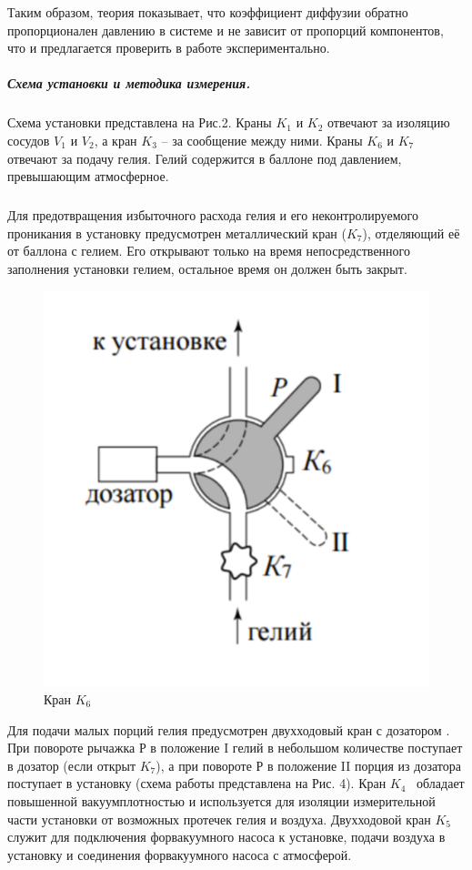 \documentclass[a4paper,12pt]{article}
\begin{document}
 
 Таким образом, теория показывает, что коэффициент диффузии обратно пропорционален давлению в системе и не зависит от пропорций компонентов, что и предлагается проверить в работе экспериментально. 
 

 
 
 \subparagraph*{Схема установки и методика измерения.} 
 
 Схема установки представлена на Рис.2. Краны $K_1$ и $K_2$ отвечают за изоляцию сосудов $V_1$ и $V_2$, а кран $K_3$ -- за сообщение между ними. Краны $K_6$ и  $K_7$ отвечают за подачу гелия. Гелий содержится в баллоне  под давлением, превышающим атмосферное. 

\subparagraph*{}Для предотвращения избыточного расхода гелия и его неконтролируемого проникания в установку предусмотрен металлический кран ($K_7$), отделяющий её от баллона с гелием. Его открывают только на время непосредственного заполнения установки гелием, остальное время он должен быть закрыт. 


\begin{figure} 
	\centering 
	\includegraphics[scale=0.17]{3.jpg} 
	\caption{Кран $K_6$} 
\end{figure}

Для подачи малых порций гелия предусмотрен двухходовый кран с дозатором . При повороте рычажка $Р$ в положение I гелий в небольшом количестве поступает в дозатор (если открыт $K_7$),  а при повороте $Р$ в положение II порция из дозатора поступает в установку (схема работы представлена на Рис. 4). Кран $K_4$  обладает повышенной вакуумплотностью и используется для изоляции измерительной части установки от возможных протечек гелия и воздуха. Двухходовой кран $K_5$ служит для подключения форвакуумного насоса к установке, подачи воздуха в установку и соединения форвакуумного насоса с атмосферой. 
\end{document}

